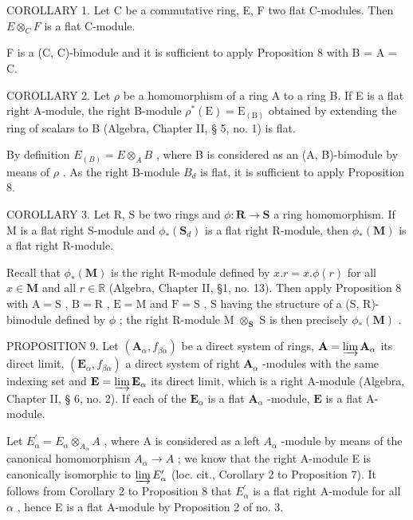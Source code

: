 COROLLARY 1. Let C be a commutative ring, E, F two flat C-modules. Then \(E \otimes_{C} F\) is a flat C-module.

F is a (C, C)-bimodule and it is sufficient to apply Proposition 8 with B = A = C.

COROLLARY 2. Let \(\rho\) be a homomorphism of a ring A to a ring B. If E is a flat right A-module, the right B-module \(\rho^{*}(\mathrm{E}) = \mathrm{E}_{(\mathrm{B})}\) obtained by extending the ring of scalars to B (Algebra, Chapter II, § 5, no. 1) is flat.

By definition \(E_{(B)} = E \otimes_{A} B\) , where B is considered as an (A, B)-bimodule by means of \(\rho\) . As the right B-module \(B_{d}\) is flat, it is sufficient to apply Proposition 8.

COROLLARY 3. Let R, S be two rings and \(\phi: \mathbf{R} \to \mathbf{S}\) a ring homomorphism. If M is a flat right S-module and \(\phi_*(\mathbf{S}_d)\) is a flat right R-module, then \(\phi_*(\mathbf{M})\) is a flat right R-module.

Recall that \(\phi_{*}(\mathbf{M})\) is the right R-module defined by \(x.r = x.\phi (r)\) for all \(x\in \mathbf{M}\) and all \(r\in \mathbb{R}\) (Algebra, Chapter II, §1, no. 13). Then apply Proposition 8 with \(\mathrm{A} = \mathrm{S}\) , \(\mathrm{B} = \mathrm{R}\) , \(\mathrm{E} = \mathrm{M}\) and \(\mathrm{F} = \mathrm{S}\) , S having the structure of a (S, R)-bimodule defined by \(\phi\) ; the right R-module M \(\otimes_{\mathbf{S}}\) S is then precisely \(\phi_{*}(\mathbf{M})\) .

PROPOSITION 9. Let \((\mathbf{A}_{\alpha}, f_{\beta \alpha})\) be a direct system of rings, \(\mathbf{A} = \varinjlim \mathbf{A}_{\alpha}\) its direct limit, \((\mathbf{E}_{\alpha}, f_{\beta \alpha})\) a direct system of right \(\mathbf{A}_{\alpha}\) -modules with the same indexing set and \(\mathbf{E} = \varinjlim \mathbf{E}_{\alpha}\) its direct limit, which is a right A-module (Algebra, Chapter II, § 6, no. 2). If each of the \(\mathbf{E}_{\alpha}\) is a flat \(\mathbf{A}_{\alpha}\) -module, \(\mathbf{E}\) is a flat A-module.

Let \(E_{\alpha}^{\prime}=E_{\alpha}\otimes_{A_{\alpha}}A\) , where A is considered as a left \(A_{\alpha}\) -module by means of the canonical homomorphism \(A_{\alpha}\to A\) ; we know that the right A-module E is canonically isomorphic to \(\varinjlim E_{\alpha}^{\prime}\) (loc. cit., Corollary 2 to Proposition 7). It follows from Corollary 2 to Proposition 8 that \(E_{\alpha}^{\prime}\) is a flat right A-module for all \(\alpha\) , hence E is a flat A-module by Proposition 2 of no. 3.

